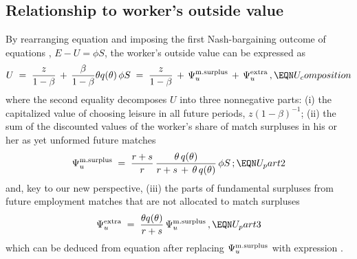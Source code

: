 \subsection{Relationship to worker's outside value}
By rearranging equation  and imposing the first
Nash-bargaining outcome of equations , $E-U=\phi S$,
the worker's outside value can be expressed as
$$
U \;=\; \frac{z}{1-\beta} \,+\, \frac{\beta}{1-\beta}
\theta q(\theta)\,\phi S
\;=\; \frac{z}{1-\beta}\,+\,\Psi^{\rm m.surplus}_u
                             \,+\,\Psi^{\rm extra}_u\,,
                                                    \EQN U_composition
$$
where the second equality decomposes $U$ into three nonnegative parts: (i) the
capitalized value of choosing leisure in all future periods,
$z(1-\beta)^{-1}$; (ii)  the sum %
of the discounted values of the worker's share of match
surpluses in his or her as yet unformed future
matches
$$
\Psi^{\rm m.surplus}_u \;=\;
\frac{r+s}{r} \, \frac{\theta\,q(\theta)}{r+s\,+\,\theta\,q(\theta)}
\, \phi S\,;
                                                 \EQN U_part2
$$
 and, key to our new perspective, (iii)
the  parts %
of fundamental surpluses
from future employment matches that are not allocated to match
surpluses
$$
\Psi^{\rm extra}_u \;=\; \frac{\theta q(\theta)}{r+s}
\, \Psi^{\rm m.surplus}_u \,,
                                                  \EQN U_part3
$$
which can be deduced from equation 
after replacing $\Psi^{\rm m.surplus}_u$ with
expression .

